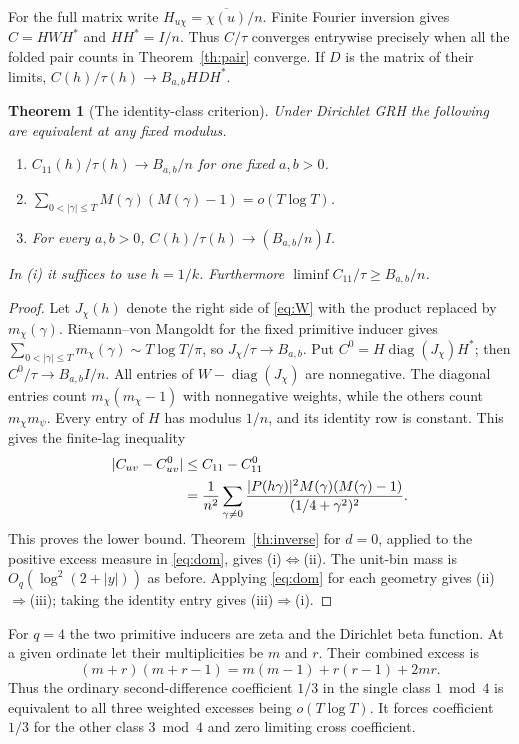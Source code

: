 \documentclass[11pt]{article}
\newtheorem{theorem}{Theorem}[section]
\newcommand{\ol}{\overline}
\DeclareMathOperator{\diag}{diag}
\begin{document}
For the full matrix write $H_{u\chi}=\ol{\chi(u)}/n$. Finite Fourier inversion gives $C=HWH^*$ and $HH^*=I/n$. Thus $C/\tau$ converges entrywise precisely when all the folded pair counts in Theorem~\ref{th:pair} converge. If $D$ is the matrix of their limits, $C(h)/\tau(h)\to B_{a,b}HDH^*$.

\begin{theorem}[The identity-class criterion]\label{th:identity}
Under Dirichlet GRH the following are equivalent at any fixed modulus.
\begin{enumerate}[label=\textup{(\roman*)}]
\item $C_{11}(h)/\tau(h)\to B_{a,b}/n$ for one fixed $a,b>0$.
\item $\displaystyle\sum_{0<|\gamma|\le T}M(\gamma)(M(\gamma)-1)=o(T\log T)$.
\item For every $a,b>0$, $C(h)/\tau(h)\to (B_{a,b}/n)I$.
\end{enumerate}
In (i) it suffices to use $h=1/k$. Furthermore $\liminf C_{11}/\tau\ge B_{a,b}/n$.
\end{theorem}
\begin{proof}
Let $J_\chi(h)$ denote the right side of \eqref{eq:W} with the product replaced by $m_\chi(\gamma)$. Riemann--von Mangoldt for the fixed primitive inducer gives $\sum_{0<|\gamma|\le T}m_\chi(\gamma)\sim T\log T/\pi$, so $J_\chi/\tau\to B_{a,b}$. Put $C^0=H\diag(J_\chi)H^*$; then $C^0/\tau\to B_{a,b}I/n$. All entries of $W-\diag(J_\chi)$ are nonnegative. The diagonal entries count $m_\chi(m_\chi-1)$ with nonnegative weights, while the others count $m_\chi m_\psi$. Every entry of $H$ has modulus $1/n$, and its identity row is constant. This gives the finite-lag inequality
\begin{align}
 |C_{uv}-C^0_{uv}|&\le C_{11}-C^0_{11}\notag\\
 &=\frac{1}{n^2}\sum_{\gamma\ne0}\frac{|P(h\gamma)|^2M(\gamma)(M(\gamma)-1)}{(1/4+\gamma^2)^2}.\label{eq:dom}
\end{align}
This proves the lower bound. Theorem~\ref{th:inverse} for $d=0$, applied to the positive excess measure in \eqref{eq:dom}, gives (i)$\Leftrightarrow$(ii). The unit-bin mass is $O_q(\log^2(2+|y|))$ as before. Applying \eqref{eq:dom} for each geometry gives (ii)$\Rightarrow$(iii); taking the identity entry gives (iii)$\Rightarrow$(i).
\end{proof}

For $q=4$ the two primitive inducers are zeta and the Dirichlet beta function. At a given ordinate let their multiplicities be $m$ and $r$. Their combined excess is
\[
 (m+r)(m+r-1)=m(m-1)+r(r-1)+2mr .
\]
Thus the ordinary second-difference coefficient $1/3$ in the single class $1\bmod4$ is equivalent to all three weighted excesses being $o(T\log T)$. It forces coefficient $1/3$ for the other class $3\bmod4$ and zero limiting cross coefficient.
\end{document}
